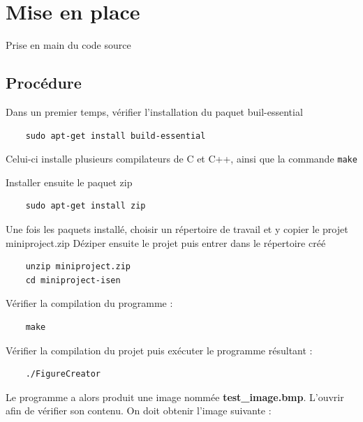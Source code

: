 \documentclass[
	12pt, %
]{fphw}
\begin{document}
\section*{Mise en place}

\begin{problem}
	Prise en main du code source
\end{problem}

\subsection*{Procédure}

Dans un premier temps, vérifier l'installation du paquet buil-essential
\begin{verbatim}
	sudo apt-get install build-essential
\end{verbatim}

Celui-ci installe plusieurs compilateurs de C et C++, ainsi que la commande \verb"make"

Installer ensuite le paquet zip
\begin{verbatim}
	sudo apt-get install zip
\end{verbatim}

Une fois les paquets installé, choisir un répertoire de travail et y copier le projet miniproject.zip
Déziper ensuite le projet puis entrer dans le répertoire créé
\begin{verbatim}
	unzip miniproject.zip
	cd miniproject-isen
\end{verbatim}

Vérifier la compilation du programme :
\begin{verbatim}
	make
\end{verbatim}

Vérifier la compilation du projet puis exécuter le programme résultant :

\begin{verbatim}
	./FigureCreator
\end{verbatim}

Le programme a alors produit une image nommée \textbf{test\_image.bmp}. L'ouvrir afin de vérifier son contenu. On doit obtenir l'image suivante :
\end{document}
